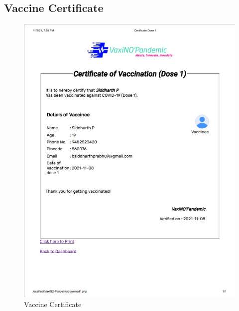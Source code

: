 \documentclass{article}
\begin{document}
    \subsection{Vaccine Certificate}
        \begin{figure}[hbt]
            \centering
            \includegraphics[scale=0.9]{cert.jpg}
            \caption{Vaccine Certificate}
            \label{fig:certificate}
        \end{figure}
    \newpage
\end{document}

